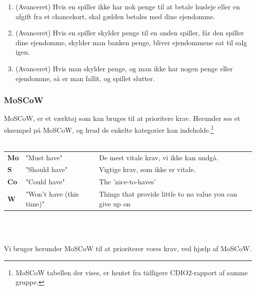 \begin{enumerate}
\item (Avanceret) Hvis en spiller ikke har nok penge til at betale husleje eller en afgift fra et chancekort, skal gælden betales med dine ejendomme.
\item (Avanceret) Hvis en spiller skylder penge til en anden spiller, får den spiller dine ejendomme, skylder man banken penge, bliver ejendommene sat til salg igen.
\item (Avanceret) Hvis man skylder penge, og man ikke har nogen penge eller ejendomme, så er man fallit, og spillet slutter.\\
\end{enumerate}

\subsubsection{MoSCoW}

MoSCoW, er et værktøj som kan bruges til at prioritere krav.
Herunder ses et eksempel på MoSCoW, og hvad de enkelte kategorier kan indeholde.\footnote{MoSCoW tabellen der vises, er hentet fra tidligere CDIO2-rapport af samme gruppe.} \\\\

\begin{tabular}{lll}
    \textbf{Mo} &   
    "Must have"                 &
    De mest vitale krav, vi ikke kan undgå. \\

    \textbf{S}  &   
    "Should have"               & 
    Vigtige krav, som ikke er vitale. \\

    \textbf{Co} &   
    "Could have"                & 
    The 'nice-to-haves' \\

    \textbf{W}  &   
    "Won’t have (this time)"    & 
    Things that provide little to no value you can give up on \\

\end{tabular}
\\\\

\pagebreak

\noindent Vi bruger herunder MoSCoW til at prioriterer vores krav, ved hjælp af MoSCoW.

